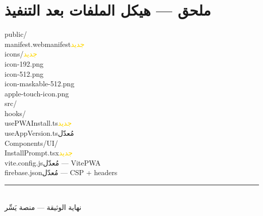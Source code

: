 \documentclass[11pt]{article}
\begin{document}
\section{ملحق — هيكل الملفات بعد التنفيذ}
\begin{tcolorbox}[colback=darkbg, colframe=darkbg, coltext=white, arc=3pt, left=8pt, right=8pt]
\ttfamily\small\raggedleft
public/\\
\hspace*{1em}manifest.webmanifest\hspace{1em}\textcolor{gold}{جديد}\\
\hspace*{1em}icons/\hspace{1em}\textcolor{gold}{جديد}\\
\hspace*{2em}icon-192.png\\
\hspace*{2em}icon-512.png\\
\hspace*{2em}icon-maskable-512.png\\
\hspace*{2em}apple-touch-icon.png\\
src/\\
\hspace*{1em}hooks/\\
\hspace*{2em}usePWAInstall.ts\hspace{1em}\textcolor{gold}{جديد}\\
\hspace*{2em}useAppVersion.ts\hspace{1em}\textcolor{okgreen}{مُعدّل}\\
\hspace*{1em}Components/UI/\\
\hspace*{2em}InstallPrompt.tsx\hspace{1em}\textcolor{gold}{جديد}\\
vite.config.js\hspace{1em}\textcolor{okgreen}{مُعدّل — VitePWA}\\
firebase.json\hspace{1em}\textcolor{okgreen}{مُعدّل — CSP + headers}
\end{tcolorbox}

\vfill
\begin{center}
\rule{0.5\textwidth}{0.4pt}\\[0.4cm]
{\small\color{midgray} نهاية الوثيقة — منصة يَسِّر}
\end{center}
\end{document}
